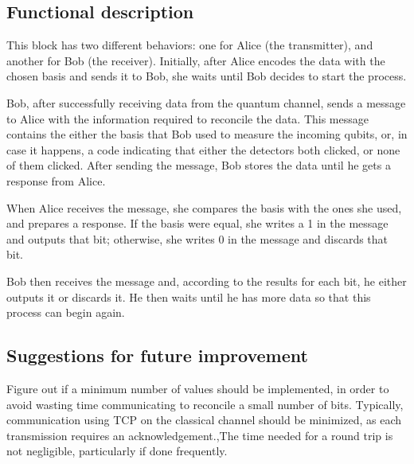 \subsection*{Functional description}

This block has two different behaviors: one for Alice (the transmitter), and
another for Bob (the receiver).
Initially, after Alice encodes the data with the chosen basis and sends it to
Bob, she waits until Bob decides to start the process.

Bob, after successfully receiving data from the quantum channel, sends a message
to Alice with the information required to reconcile the data. This message
contains the either the basis that Bob used to measure the incoming qubits, or,
in case it happens, a code indicating that either the detectors both clicked, or
none of them clicked. After sending the message, Bob stores the data until he
gets a response from Alice.

When Alice receives the message, she compares the basis with the ones she used,
and prepares a response. If the basis were equal, she writes a 1 in the message and outputs that
bit; otherwise, she writes 0 in the message and discards that bit.

Bob then receives the message and, according to the results for each bit, he
either outputs it or discards it. He then waits until he has more data so that
this process can begin again.

\subsection*{Suggestions for future improvement}

Figure out if a minimum number of values should be implemented, in order to
avoid wasting time communicating to reconcile a small number of bits. Typically,
communication using TCP on the classical channel should be minimized, as each
transmission requires an acknowledgement.,The time needed for a round trip is
not negligible, particularly if done frequently.

